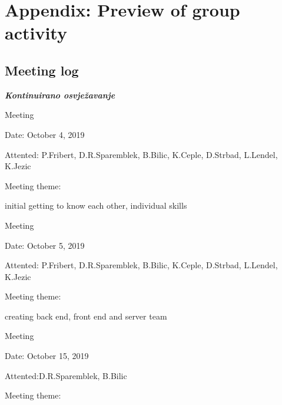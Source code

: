 \chapter*{Appendix: Preview of group activity}
		
		\section*{Meeting log}
		
		\textbf{\textit{Kontinuirano osvježavanje}}\\

		
		\begin{packed_enum}
			\item  Meeting
			

			\item[] \begin{packed_item}
				\item Date: October 4, 2019
				\item Attented: P.Fribert, D.R.Sparemblek, B.Bilic, K.Ceple, D.Strbad, L.Lendel, K.Jezic
				\item Meeting theme:
				\begin{packed_item}
					\item  initial getting to know each other, individual skills
				\end{packed_item}
			\end{packed_item}
			\item  Meeting
			\item[] \begin{packed_item}
				\item Date: October 5, 2019
				\item Attented: P.Fribert, D.R.Sparemblek, B.Bilic, K.Ceple, D.Strbad, L.Lendel, K.Jezic
				\item Meeting theme:
				\begin{packed_item}
					\item  creating back end, front end and server team
				\end{packed_item}
			\end{packed_item}
			\item  Meeting
			\item[] \begin{packed_item}
				\item Date: October 15, 2019
				\item Attented:D.R.Sparemblek, B.Bilic
				\item Meeting theme:

\end{packed_item}
\end{packed_enum}
